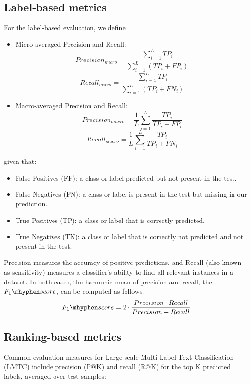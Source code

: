 \subsection{Label-based metrics}
For the label-based evaluation, we define:
\begin{itemize}
  \item Micro-averaged Precision and Recall:
    \begin{equation}
      Precision_{micro} = \frac{\sum_{i=1}^{L} TP_i}{\sum_{i=1}^{L} (TP_i + FP_i)}
    \end{equation}
    \begin{equation}
      Recall_{micro} = \frac{\sum_{i=1}^{L} TP_i}{\sum_{i=1}^{L} (TP_i + FN_i)}
    \end{equation}
  \item Macro-averaged Precision and Recall:
    \begin{equation}
      Precision_{macro} = \frac{1}{L}\sum_{i=1}^{L}\frac{TP_i}{TP_i + FP_i}
    \end{equation}
    \begin{equation}
      Recall_{macro} = \frac{1}{L}\sum_{i=1}^{L}\frac{TP_i}{TP_i + FN_i}
    \end{equation}
\end{itemize}
given that:
\begin{itemize}\itemsep=0pt
  \item False Positives (FP): a class or label predicted but not present in the test.
  \item False Negatives (FN): a class or label is present in the test but missing in our prediction.
  \item True Positives (TP): a class or label that is correctly predicted.
  \item True Negatives (TN): a class or label that is correctly not predicted and not present in the test.
\end{itemize}
Precision measures the accuracy of positive predictions, and Recall (also known as sensitivity) measures a classifier's ability to find all relevant instances in a dataset.
In both cases, the harmonic mean of precision and recall, the $F_1\mhyphen score$, can be computed as follows:
\begin{equation}
  F_1\mhyphen score = 2  \cdot \frac{Precision \cdot Recall}{Precision +  Recall}
\end{equation}

\subsection{Ranking-based metrics}
Common evaluation measures for Large-scale Multi-Label Text Classification (LMTC) include precision (P@K) and recall (R@K) for the top K predicted labels, averaged over test samples:

